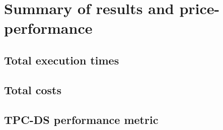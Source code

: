 \section{Summary of results and price-performance}\label{resultsSummary}

\subsection{Total execution times}\label{resultsSummaryTotalExecutionTimes}

\subsection{Total costs}\label{resultsSummaryTotalCost}

\subsection{TPC-DS performance metric}\label{resultsSummaryPerformanceMetric}
